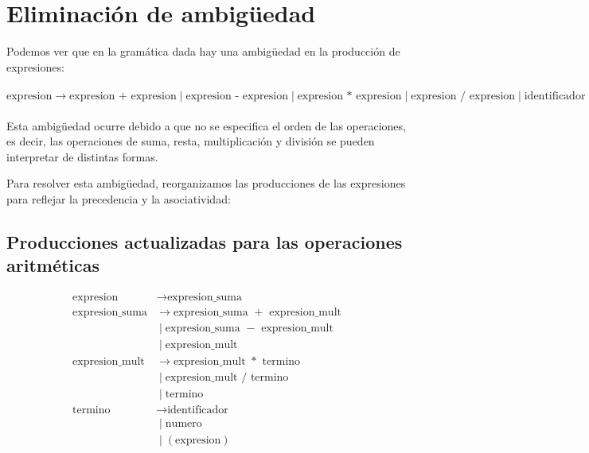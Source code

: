 \documentclass{article}
\begin{document}
\section*{Eliminación de ambigüedad}

Podemos ver que en la gramática dada hay una ambigüedad en la producción de expresiones:\\\\

\( \text{expresion} \to \text{expresion + expresion} \mid \text{expresion - expresion} \mid \text{expresion * expresion} \mid \text{expresion / expresion} \mid \text{identificador} \mid \text{numero} \)\\\\


Esta ambigüedad ocurre debido a que no se especifica el orden de las operaciones, es decir, las operaciones de suma, resta, multiplicación y división se pueden interpretar de distintas formas.

Para resolver esta ambigüedad, reorganizamos las producciones de las expresiones para reflejar la precedencia y la asociatividad:

\subsection*{Producciones actualizadas para las operaciones aritméticas}

\begin{align*}
\text{expresion} &\rightarrow \text{expresion\_suma} \\
\text{expresion\_suma} &\rightarrow \text{expresion\_suma } + \text{ expresion\_mult} \\
                      &\;|\; \text{expresion\_suma } - \text{ expresion\_mult} \\
                      &\;|\; \text{expresion\_mult} \\
\text{expresion\_mult} &\rightarrow \text{expresion\_mult } * \text{ termino} \\
                      &\;|\; \text{expresion\_mult } / \text{ termino} \\
                      &\;|\; \text{termino} \\
\text{termino} &\rightarrow \text{identificador} \\
               &\;|\; \text{numero} \\
               &\;|\; ( \text{expresion} ) \\
\end{align*}
\end{document}
